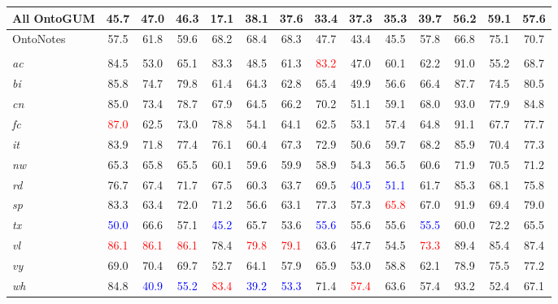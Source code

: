\documentclass[11pt,a4paper]{article}
\begin{document}
\begin{table*}[t!hb]
\begin{tabular}{l|cccccccccc|ccc}
    \hline
    \rule{0pt}{2ex}All OntoGUM & 45.7 & 47.0 & 46.3 & 17.1 & 38.1 & 37.6 & 33.4 & 37.3 & 35.3 & 39.7 & 56.2 & 59.1 & 57.6 \\
    \hline
    \rule{0pt}{2ex}OntoNotes & 57.5 & 61.8 & 59.6 & 68.2 & 68.4 & 68.3 & 47.7 & 43.4 & 45.5 & 57.8 & 66.8 & 75.1 & 70.7 \\
    
\hline\hline
    
    & \multicolumn{13}{c}{\citet{DBLP:journals/corr/abs-1907-10529}}\\\hline
    \textit{ac} & 84.5 & 53.0 & 65.1 & 83.3 & 48.5 & 61.3 & \textcolor{red}{83.2} & 47.0 & 60.1 & 62.2 & 91.0 & 55.2 & 68.7 \\
    \textit{bi} & 85.8 & 74.7 & 79.8 & 61.4 & 64.3 & 62.8 & 65.4 & 49.9 & 56.6 & 66.4 & 87.7 & 74.5 & 80.5\\
    \textit{cn} & 85.0 & 73.4 & 78.7 & 67.9 & 64.5 & 66.2 & 70.2 & 51.1 & 59.1 & 68.0 & 93.0 & 77.9 & 84.8\\
    \textit{fc} & \textcolor{red}{87.0} & 62.5 & 73.0 & 78.8 & 54.1 & 64.1 & 62.5 & 53.1 & 57.4 & 64.8 & 91.1 & 67.7 & 77.7\\
    \textit{it} & 83.9 & 71.8 & 77.4 & 76.1 & 60.4 & 67.3 & 72.9 & 50.6 & 59.7 & 68.2 & 85.9 & 70.4 & 77.3\\
    \textit{nw} & 65.3 & 65.8 & 65.5 & 60.1 & 59.6 & 59.9 & 58.9 & 54.3 & 56.5 & 60.6 & 71.9 & 70.5 & 71.2 \\
    \textit{rd} & 76.7 & 67.4 & 71.7 & 67.5 & 60.3 & 63.7 & 69.5 & \textcolor{blue}{40.5} & \textcolor{blue}{51.1} & 61.7 & 85.3 & 68.1 & 75.8 \\
    \textit{sp} & 83.3 & 63.4 & 72.0 & 71.2 & 56.6 & 63.1 & 77.3 & 57.3 & \textcolor{red}{65.8} & 67.0 & 91.9 & 69.4 & 79.0\\
    \textit{tx} & \textcolor{blue}{50.0} & 66.6 & 57.1 & \textcolor{blue}{45.2} & 65.7 & 53.6 & \textcolor{blue}{55.6} & 55.6 & 55.6 & \textcolor{blue}{55.5} & 60.0 & 72.2 & 65.5\\
    \textit{vl} & \textcolor{red}{86.1} & \textcolor{red}{86.1} & \textcolor{red}{86.1} & 78.4 & \textcolor{red}{79.8} & \textcolor{red}{79.1} & 63.6 & 47.7 & 54.5 & \textcolor{red}{73.3} & 89.4 & 85.4 & 87.4\\
    \textit{vy} & 69.0 & 70.4 & 69.7 & 52.7 & 64.1 & 57.9 & 65.9 & 53.0 & 58.8 & 62.1 & 78.9 & 75.5 & 77.2\\
    \textit{wh} & 84.8 & \textcolor{blue}{40.9} & \textcolor{blue}{55.2} & \textcolor{red}{83.4} & \textcolor{blue}{39.2} & \textcolor{blue}{53.3} & 71.4 & \textcolor{red}{57.4} & 63.6 & 57.4 & 93.2 & 52.4 & 67.1\\


\end{tabular}
\end{table*}
\end{document}
